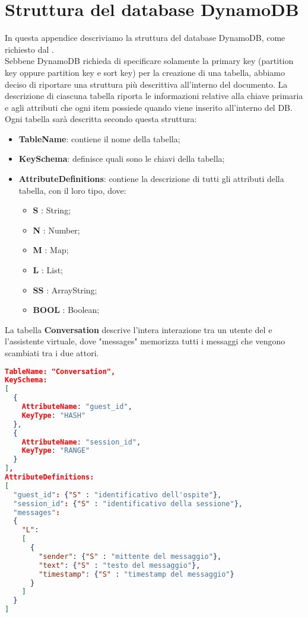 \section{Struttura del database DynamoDB}
In questa appendice descriviamo la struttura del database DynamoDB, come richiesto dal  \PROPONENTE. \\
Sebbene DynamoDB richieda di specificare solamente la primary key (partition key oppure partition key e sort key) per la creazione di una tabella, abbiamo deciso di riportare una struttura più descrittiva all'interno del documento. La descrizione di ciascuna tabella riporta le informazioni relative alla chiave primaria e agli attributi che ogni item possiede quando viene inserito all'interno del DB.\\
Ogni tabella sarà descritta secondo questa struttura:
\begin{itemize}
 \item \textbf{TableName}: contiene il nome della tabella;
 \item \textbf{KeySchema}: definisce quali sono le chiavi della tabella;
 \item \textbf{AttributeDefinitions}: contiene la descrizione di tutti gli attributi della tabella, con il loro tipo, dove:
 \begin{itemize}
  \item \textbf{S} : String;
  \item \textbf{N} : Number;
  \item \textbf{M} : Map;
  \item \textbf{L} : List;
  \item \textbf{SS} : ArrayString;
  \item \textbf{BOOL} : Boolean;
 \end{itemize}
\end{itemize}
La tabella \textbf{Conversation} descrive l'intera interazione tra un utente del  e l'assistente virtuale, dove "messages" memorizza tutti i messaggi che vengono scambiati tra i due attori.
\begin{lstlisting}[language=json,firstnumber=1]
TableName: "Conversation",
KeySchema: 
[
  {
    AttributeName: "guest_id",
    KeyType: "HASH"
  },
  {
    AttributeName: "session_id",
    KeyType: "RANGE"	
  }
],
AttributeDefinitions: 
[
  "guest_id": {"S" : "identificativo dell'ospite"},
  "session_id": {"S" : "identificativo della sessione"},
  "messages":
  {
    "L": 
    [
      {
        "sender": {"S" : "mittente del messaggio"},
        "text": {"S" : "testo del messaggio"},
        "timestamp": {"S" : "timestamp del messaggio"}
      }
    ]
  }
]
\end{lstlisting}
